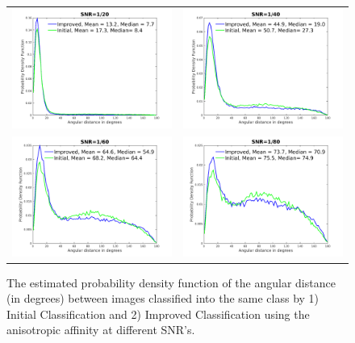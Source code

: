 \begin{figure}
\begin{center}
\begin{tabular}{cc}
\includegraphics[width=.49\columnwidth]{figures/fighist_snr1by20.png} & \includegraphics[width=.49\columnwidth]{figures/fighist_snr1by40.png} \\
\includegraphics[width=.49\columnwidth]{figures/fighist_snr1by60.png} & \includegraphics[width=.49\columnwidth]{figures/fighist_snr1by80.png}
\end{tabular}
\end{center}
\caption{The estimated probability density function of the angular distance (in degrees) between images classified into the same class by 1) Initial Classification and 2) Improved Classification using the anisotropic affinity at different SNR's.}

\label{fig:hist}
\end{figure}
